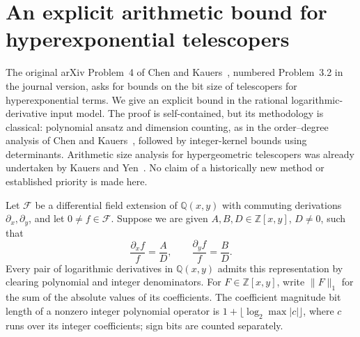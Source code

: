 \documentclass[11pt,a4paper]{article}
\theoremstyle{remark}\newtheorem{remark}[theorem]{Remark}
\begin{document}
\section{An explicit arithmetic bound for hyperexponential telescopers}
\label{he:section}

The original arXiv Problem~4 of Chen and Kauers~\cite{CK2016}, numbered
Problem~3.2 in the journal version, asks for bounds on the bit size of
telescopers for hyperexponential terms. We give an explicit bound in the
rational logarithmic-derivative input model. The proof is self-contained,
but its methodology is classical: polynomial ansatz and dimension counting,
as in the order--degree analysis of Chen and Kauers~\cite{CK2012}, followed by
integer-kernel bounds using determinants. Arithmetic size analysis for
hypergeometric telescopers was already undertaken by Kauers and Yen~\cite{KY2015}.
No claim of a historically new method or established priority is made here.

Let $\mathcal F$ be a differential field extension of $\mathbb Q(x,y)$
with commuting derivations $\partial_x,\partial_y$, and let
$0\ne f\in\mathcal F$. Suppose we are given
$A,B,D\in\mathbb Z[x,y]$, $D\ne0$, such that
\begin{equation}\label{he:input}
 \frac{\partial_x f}{f}=\frac AD,
 \qquad \frac{\partial_y f}{f}=\frac BD.
\end{equation}
Every pair of logarithmic derivatives in $\mathbb Q(x,y)$ admits this
representation by clearing polynomial and integer denominators.
For $F\in\mathbb Z[x,y]$, write $\|F\|_1$ for the sum of the absolute
values of its coefficients. The coefficient magnitude bit length of a
nonzero integer polynomial operator is
$1+\lfloor\log_2\max |c|\rfloor$, where $c$ runs over its integer
coefficients; sign bits are counted separately.
\end{document}
